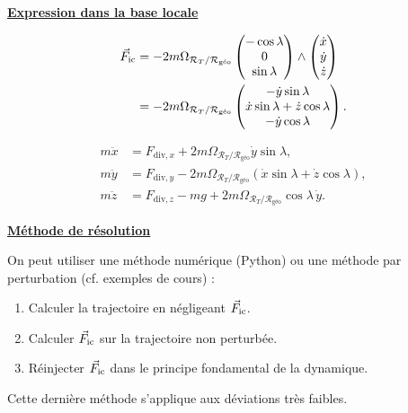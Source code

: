 \documentclass[11pt,a4paper]{article}
\newcommand{\titr}[1]{\par\textbf{\underline{#1}}\par\nopagebreak[3]}
\newcommand{\R}{\mathcal R}
\newcommand{\RT}{\R_T}\newcommand{\RH}{\R_H}\newcommand{\RG}{\R_{\text{géo}}}
\newcommand{\Om}{\vec\Omega_{\RT/\RG}}\newcommand{\om}{\Omega_{\RT/\RG}}
\begin{document}
\titr{Expression dans la base locale}
\begin{center}\end{center}
\begin{align*}
\Fic&=-2m\om\begin{pmatrix}-\cos\lambda\\0\\\sin\lambda\end{pmatrix}\wedge\begin{pmatrix}\dot x\\\dot y\\\dot z\end{pmatrix}\\
&=-2m\om\begin{pmatrix}-\dot y\sin\lambda\\\dot x\sin\lambda+\dot z\cos\lambda\\-\dot y\cos\lambda\end{pmatrix}.
\end{align*}
\begin{cadre}\[\begin{aligned}
m\ddot x&=F_{\mathrm{div},x}+2m\om\dot y\sin\lambda,\\
m\ddot y&=F_{\mathrm{div},y}-2m\om(\dot x\sin\lambda+\dot z\cos\lambda),\\
m\ddot z&=F_{\mathrm{div},z}-mg+2m\om\cos\lambda\,\dot y.
\end{aligned}\]\end{cadre}
\titr{Méthode de résolution}
On peut utiliser une méthode numérique (Python) ou une méthode par perturbation (cf. exemples de cours) :
\begin{enumerate}
\item Calculer la trajectoire en négligeant $\vec F_{\mathrm{ic}}$.
\item Calculer $\vec F_{\mathrm{ic}}$ sur la trajectoire non perturbée.
\item Réinjecter $\vec F_{\mathrm{ic}}$ dans le principe fondamental de la dynamique.
\end{enumerate}
Cette dernière méthode s'applique aux déviations très faibles.
\end{document}
